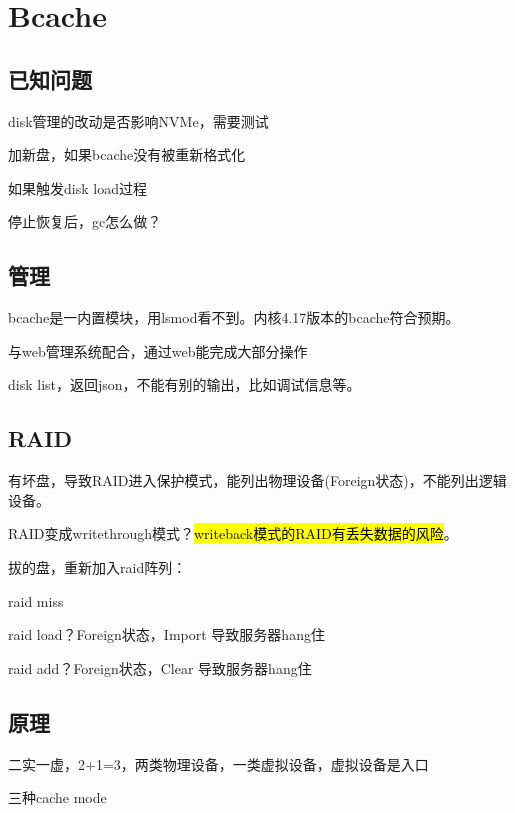 \chapter{Bcache}

\section{已知问题}

\begin{enumbox}
\item disk管理的改动是否影响NVMe，需要测试
\item 加新盘，如果bcache没有被重新格式化
\item 如果触发disk load过程
\item 停止恢复后，gc怎么做？
\end{enumbox}

\section{管理}

bcache是一内置模块，用lsmod看不到。内核4.17版本的bcache符合预期。

与web管理系统配合，通过web能完成大部分操作

disk list，返回json，不能有别的输出，比如调试信息等。

\section{RAID}

有坏盘，导致RAID进入保护模式，能列出物理设备(Foreign状态)，不能列出逻辑设备。

RAID变成writethrough模式？\hl{writeback模式的RAID有丢失数据的风险}。

拔的盘，重新加入raid阵列：
\begin{enumbox}
\item raid miss
\item raid load？Foreign状态，Import 导致服务器hang住
\item raid add？Foreign状态，Clear 导致服务器hang住
\end{enumbox}

\section{原理}

二实一虚，2+1=3，两类物理设备，一类虚拟设备，虚拟设备是入口

三种cache mode

